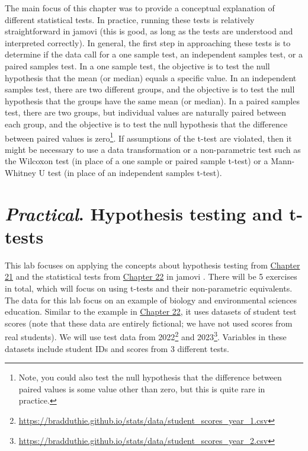 \documentclass[
  openany]{scrbook}
\begin{document}
The main focus of this chapter was to provide a conceptual explanation of different statistical tests.
In practice, running these tests is relatively straightforward in jamovi (this is good, as long as the tests are understood and interpreted correctly).
In general, the first step in approaching these tests is to determine if the data call for a one sample test, an independent samples test, or a paired samples test.
In a one sample test, the objective is to test the null hypothesis that the mean (or median) equals a specific value.
In an independent samples test, there are two different groups, and the objective is to test the null hypothesis that the groups have the same mean (or median).
In a paired samples test, there are two groups, but individual values are naturally paired between each group, and the objective is to test the null hypothesis that the difference between paired values is zero\footnote{Note, you could also test the null hypothesis that the difference between paired values is some value other than zero, but this is quite rare in practice.}.
If assumptions of the t-test are violated, then it might be necessary to use a data transformation or a non-parametric test such as the Wilcoxon test (in place of a one sample or paired sample t-test) or a Mann-Whitney U test (in place of an independent samples t-test).

\hypertarget{Chapter_23}{%
\chapter{\texorpdfstring{\emph{Practical}. Hypothesis testing and t-tests}{Practical. Hypothesis testing and t-tests}}\label{Chapter_23}}

This lab focuses on applying the concepts about hypothesis testing from \protect\hyperlink{Chapter_21}{Chapter 21} and the statistical tests from \protect\hyperlink{Chapter_22}{Chapter 22} in jamovi \citep{Jamovi2022}.
There will be 5 exercises in total, which will focus on using t-tests and their non-parametric equivalents.
The data for this lab focus on an example of biology and environmental sciences education.
Similar to the example in \protect\hyperlink{Chapter_22}{Chapter 22}, it uses datasets of student test scores (note that these data are entirely fictional; we have not used scores from real students).
We will use test data from 2022\footnote{\url{https://bradduthie.github.io/stats/data/student_scores_year_1.csv}} and 2023\footnote{\url{https://bradduthie.github.io/stats/data/student_scores_year_2.csv}}.
Variables in these datasets include student IDs and scores from 3 different tests.
\end{document}
